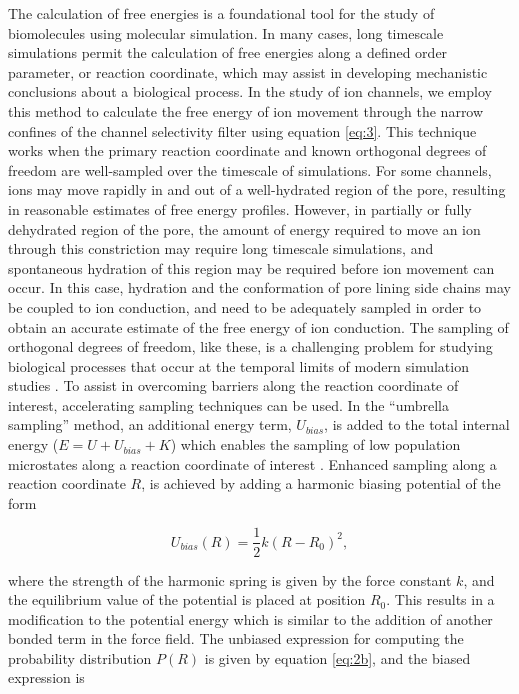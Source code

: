 \begin{refsection}
The calculation of free energies is a foundational tool for the study of biomolecules using molecular simulation. In many cases, long timescale simulations permit the calculation of free energies along a defined order parameter, or reaction coordinate, which may assist in developing mechanistic conclusions about a biological process. In the study of ion channels, we employ this method to calculate the free energy of ion movement through the narrow confines of the channel selectivity filter using equation \ref{eq:3}. This technique works when the primary reaction coordinate and known orthogonal degrees of freedom are well-sampled over the timescale of simulations. For some channels, ions may move rapidly in and out of a well-hydrated region of the pore, resulting in reasonable estimates of free energy profiles. However, in partially or fully dehydrated region of the pore, the amount of energy required to move an ion through this constriction may require long timescale simulations, and spontaneous hydration of this region may be required before ion movement can occur. In this case, hydration and the conformation of pore lining side chains may be coupled to ion conduction, and need to be adequately sampled in order to obtain an accurate estimate of the free energy of ion conduction. The sampling of orthogonal degrees of freedom, like these, is a challenging problem for studying biological processes that occur at the temporal limits of modern simulation studies \cite{Neale:2016gj}. To assist in overcoming barriers along the reaction coordinate of interest, accelerating sampling techniques can be used. In the ``umbrella sampling'' method, an additional energy term, $U_{bias}$, is added to the total internal energy ($E=U+U_{bias}+K$) which enables the sampling of low population microstates along a reaction coordinate of interest \cite{Kastner:2011ft,Roux:1995js,Torrie:1977hs}. Enhanced sampling along a reaction coordinate $R$, is achieved by adding a harmonic biasing potential of the form

\begin{equation}
\label{eq:50}
U_{bias}(R) = \frac{1}{2} k (R-R_0)^2,
\end{equation}

where the strength of the harmonic spring is given by the force constant $k$, and the equilibrium value of the potential is placed at position $R_0$. This results in a modification to the potential energy which is similar to the addition of another bonded term in the force field. The unbiased expression for computing the probability distribution $P(R)$ is given by equation \ref{eq:2b}, and the biased expression is 


\end{refsection}

